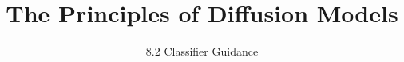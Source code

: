 ﻿%

\graphicspath{{../images/}}
\title{The Principles of Diffusion Models}
\subtitle{8.2 Classifier Guidance}


\begin{frame}
    \titlepage
\end{frame}



